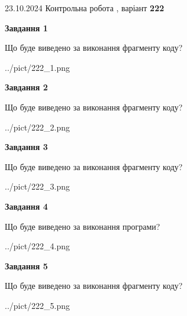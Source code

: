 \documentclass[12pt, ukrainian]{article}
\begin{document}
{\Large{23.10.2024 Контрольна робота , варіант  \No \textbf { 222 }\par}}
{
\begin {large}
{\begin {center}\textbf{Завдання 1}\end {center}}

Що буде виведено за виконання фрагменту коду?\par
\begin{center}
	{../pict/222_1.png}
\end{center}
\newpage

{\begin {center}\textbf{Завдання 2}\end {center}}

Що буде виведено за виконання фрагменту коду?\par
\begin{center}
	{../pict/222_2.png}
\end{center}
\newpage

{\begin {center}\textbf{Завдання 3}\end {center}}

Що буде виведено за виконання фрагменту коду?\par
\begin{center}
	{../pict/222_3.png}
\end{center}
\newpage

{\begin {center}\textbf{Завдання 4}\end {center}}

Що буде виведено за виконання програми?\par
\begin{center}
	{../pict/222_4.png}
\end{center}
\newpage

{\begin {center}\textbf{Завдання 5}\end {center}}

Що буде виведено за виконання фрагменту коду?\par
\begin{center}
	{../pict/222_5.png}
\end{center}
\newpage


\end{large}}
\end{document}
